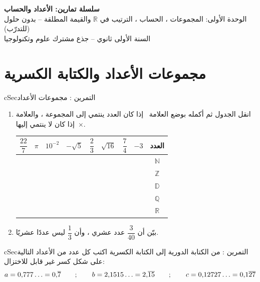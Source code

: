 \documentclass[12pt,a4paper]{article}
\newenvironment{BOX}[2]{\begin{otherlanguage}{english}\begin{arbox}{#1}{#2}}{\end{arbox}\end{otherlanguage}}
\newcounter{exo}
\newenvironment{tamrin}[1]{\stepcounter{exo}\begin{BOX}{cSec}{التمرين \theexo: #1}}{\end{BOX}}
\newenvironment{LTR}{\begin{otherlanguage}{english}}{\end{otherlanguage}}
\newcommand{\ar}[1]{\foreignlanguage{arabic}{#1}}
\renewcommand{\dots}{\mathinner{\ldotp\ldotp\ldotp}}
\newcommand{\N}{\mathbb{N}}
\newcommand{\Z}{\mathbb{Z}}
\newcommand{\D}{\mathbb{D}}
\newcommand{\Q}{\mathbb{Q}}
\newcommand{\R}{\mathbb{R}}
\newcommand{\yes}{{\color{cRem}\checkmark}}
\newcommand{\no}{{\color{cThm}$\times$}}
\begin{document}
\begin{LTR}
\begin{tcolorbox}[enhanced,colback=cSec!10,colframe=cSec!40,arc=3mm,halign=center,boxrule=0.6pt,top=12pt,bottom=12pt,before upper={\selectlanguage{arabic}}]
{\color{cSec}\fontsize{25}{31}\selectfont\bfseries سلسلة تمارين: الأعداد والحساب}\\[8pt]
{\color{cSec!80!black}\large الوحدة الأولى: المجموعات ، الحساب ، الترتيب في $\mathbb{R}$ والقيمة المطلقة -- بدون حلول (للتدرّب)}\\[5pt]
{\color{cSec!80!black}\large السنة الأولى ثانوي -- جذع مشترك علوم وتكنولوجيا}
\end{tcolorbox}
\end{LTR}

\section{مجموعات الأعداد والكتابة الكسرية}
\begin{tamrin}{مجموعات الأعداد}
\begin{enumerate}
\item انقل الجدول ثم أكمله بوضع العلامة \yes\ إذا كان العدد ينتمي إلى المجموعة ، والعلامة \no\ إذا كان لا ينتمي إليها.
\begin{center}
\renewcommand{\arraystretch}{1.6}
\begin{tabular}{|c|c|c|c|c|c|c|c|c|}\hline
\rowcolor{cSec!12}$\dfrac{22}7$ & $\pi$ & $10^{-2}$ & $-\sqrt5$ & $\dfrac23$ & $\sqrt{16}$ & $\dfrac74$ & $-3$ & \ar{العدد}\\\hline
 & & & & & & & & $\N$\\\hline
 & & & & & & & & $\Z$\\\hline
 & & & & & & & & $\D$\\\hline
 & & & & & & & & $\Q$\\\hline
 & & & & & & & & $\R$\\\hline
\end{tabular}
\end{center}
\item بيّن أن $\dfrac3{40}$ عدد عشري ، وأن $\dfrac13$ ليس عددًا عشريًا.
\end{enumerate}
\end{tamrin}

\begin{tamrin}{من الكتابة الدورية إلى الكتابة الكسرية}
اكتب كل عدد من الأعداد التالية على شكل كسر غير قابل للاختزال:
\[a=0{,}777\dots=0{,}\overline{7}\qquad;\qquad b=2{,}1515\dots=2{,}\overline{15}\qquad;\qquad c=0{,}12727\dots=0{,}1\overline{27}\]
\end{tamrin}
\end{document}
